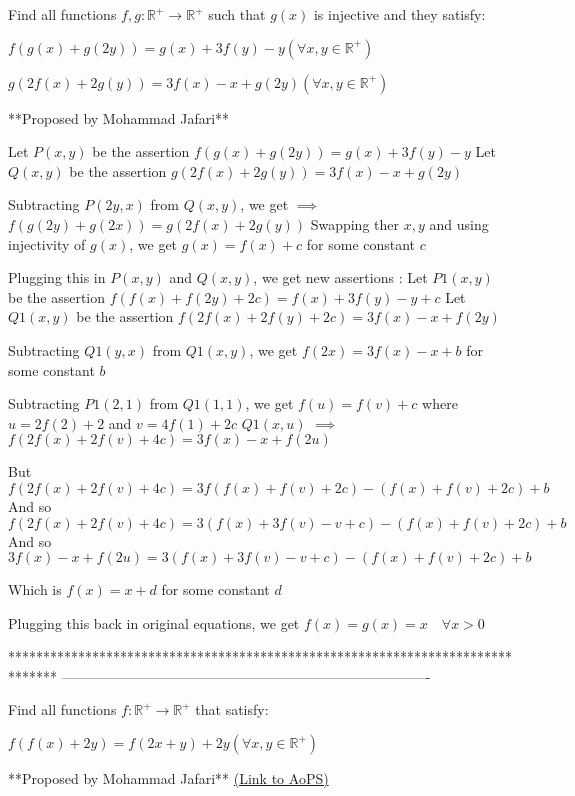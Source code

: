 \begin{solution}
	\begin{tcolorbox}Find all functions $f,g:\mathbb{R}^{+} \to \mathbb{R}^{+}$ such that $g(x)$ is injective and they satisfy:

$f(g(x)+g(2y))=g(x)+3f(y)-y(\forall x,y \in \mathbb{R}^{+})$

$g(2f(x)+2g(y))=3f(x)-x+g(2y) (\forall x,y \in \mathbb{R}^{+})$

**Proposed by Mohammad Jafari**\end{tcolorbox}
Let $P(x,y)$ be the assertion $f(g(x)+g(2y))=g(x)+3f(y)-y$
Let $Q(x,y)$ be the assertion $g(2f(x)+2g(y))=3f(x)-x+g(2y)$

Subtracting $P(2y,x)$ from $Q(x,y)$, we get $\implies$ $f(g(2y)+g(2x))=g(2f(x)+2g(y))$
Swapping ther $x,y$ and using injectivity of $g(x)$, we get $g(x)=f(x)+c$ for some constant $c$

Plugging this in $P(x,y)$ and $Q(x,y)$, we get new assertions :
Let $P1(x,y)$ be the assertion $f(f(x)+f(2y)+2c)=f(x)+3f(y)-y+c$
Let $Q1(x,y)$ be the assertion $f(2f(x)+2f(y)+2c)=3f(x)-x+f(2y)$

Subtracting $Q1(y,x)$ from $Q1(x,y)$, we get $f(2x)=3f(x)-x+b$ for some constant $b$

Subtracting $P1(2,1)$ from $Q1(1,1)$, we get $f(u)=f(v)+c$ where $u=2f(2)+2$ and $v=4f(1)+2c$
$Q1(x,u)$ $\implies$ $f(2f(x)+2f(v)+4c)=3f(x)-x+f(2u)$

But $f(2f(x)+2f(v)+4c)=3f(f(x)+f(v)+2c)-(f(x)+f(v)+2c)+b$
And so $f(2f(x)+2f(v)+4c)=3(f(x)+3f(v)-v+c)-(f(x)+f(v)+2c)+b$
And so $3f(x)-x+f(2u)=3(f(x)+3f(v)-v+c)-(f(x)+f(v)+2c)+b$

Which is $f(x)=x+d$ for some constant $d$

Plugging this back in original equations, we get 
$\boxed{f(x)=g(x)=x\quad\forall x>0}$


\end{solution}
*******************************************************************************
-------------------------------------------------------------------------------

\begin{problem}
	Find all functions $f:\mathbb{R}^{+} \to \mathbb{R}^{+}$ that satisfy:

$f(f(x)+2y)=f(2x+y)+2y (\forall x,y \in \mathbb{R}^{+})$

**Proposed by Mohammad Jafari**
	\flushright \href{https://artofproblemsolving.com/community/c6h1611727}{(Link to AoPS)}
\end{problem}



